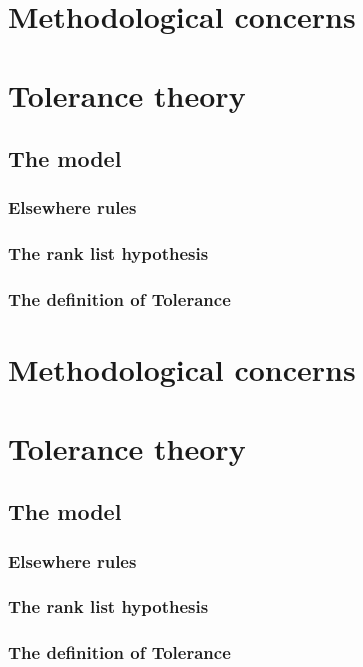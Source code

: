 \section{Methodological concerns}

\section{Tolerance theory}

\subsection{The model}

\subsubsection{Elsewhere rules}

\subsubsection{The rank list hypothesis}

\subsubsection{The definition of Tolerance}

\section{Methodological concerns}
\section{Tolerance theory}

\subsection{The model}

\subsubsection{Elsewhere rules}

\subsubsection{The rank list hypothesis}

\subsubsection{The definition of Tolerance}

